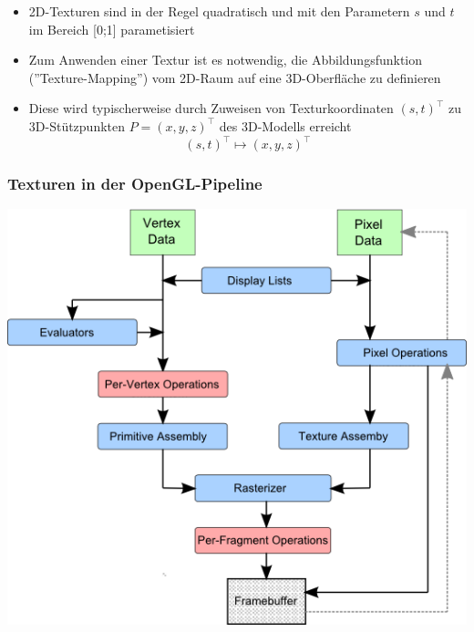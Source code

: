 \documentclass{scrartcl}
\begin{document}
\begin{itemize}
	\item 2D-Texturen sind in der Regel quadratisch und mit den Parametern $s$ und $t$ im Bereich [0;1] parametisiert
	\item Zum Anwenden einer Textur ist es notwendig, die Abbildungsfunktion (''Texture-Mapping'') vom 2D-Raum auf eine 3D-Oberfläche zu definieren
	\item Diese wird typischerweise durch Zuweisen von Texturkoordinaten $(s,t)^\top$ zu 3D-Stützpunkten $P = (x,y,z)^\top$ des 3D-Modells erreicht
	\begin{equation}
		(s,t)^\top \mapsto (x,y,z)^\top
	\end{equation}
\end{itemize}

\subsubsection{Texturen in der OpenGL-Pipeline}

\includegraphics[scale=1]{figures/openglpipeline.png}
\end{document}
